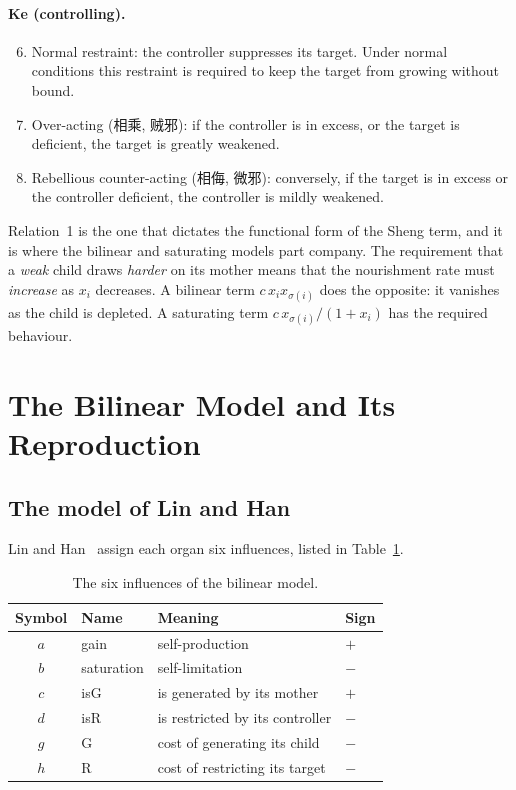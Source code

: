 \documentclass[11pt]{article}
\begin{document}
\paragraph{Ke (controlling).}
\begin{enumerate}\setcounter{enumi}{5}
\item Normal restraint: the controller suppresses its target. Under normal
      conditions this restraint is required to keep the target from growing
      without bound.
\item Over-acting (相乘, 贼邪): if the controller is in excess, or the target is
      deficient, the target is greatly weakened.
\item Rebellious counter-acting (相侮, 微邪): conversely, if the target is in
      excess or the controller deficient, the controller is mildly weakened.
\end{enumerate}

Relation~1 is the one that dictates the functional form of the Sheng term, and
it is where the bilinear and saturating models part company. The requirement
that a \emph{weak} child draws \emph{harder} on its mother means that the
nourishment rate must \emph{increase} as $x_i$ decreases. A bilinear term
$c\,x_i x_{\sigma(i)}$ does the opposite: it vanishes as the child is depleted.
A saturating term $c\,x_{\sigma(i)}/(1+x_i)$ has the required behaviour.
\section{The Bilinear Model and Its Reproduction}\label{sec:bilinear}

\subsection{The model of Lin and Han}

Lin and Han~\cite{Lin2020} assign each organ six influences, listed in
Table~\ref{tab:six}.

\begin{table}[!htb]
\centering
\begin{tabular}{clll}
\toprule
Symbol & Name & Meaning & Sign \\
\midrule
$a$ & gain        & self-production                      & $+$ \\
$b$ & saturation  & self-limitation                      & $-$ \\
$c$ & isG         & is generated by its mother           & $+$ \\
$d$ & isR         & is restricted by its controller      & $-$ \\
$g$ & G           & cost of generating its child         & $-$ \\
$h$ & R           & cost of restricting its target       & $-$ \\
\bottomrule
\end{tabular}
\caption{The six influences of the bilinear model.}
\label{tab:six}
\end{table}
\end{document}
